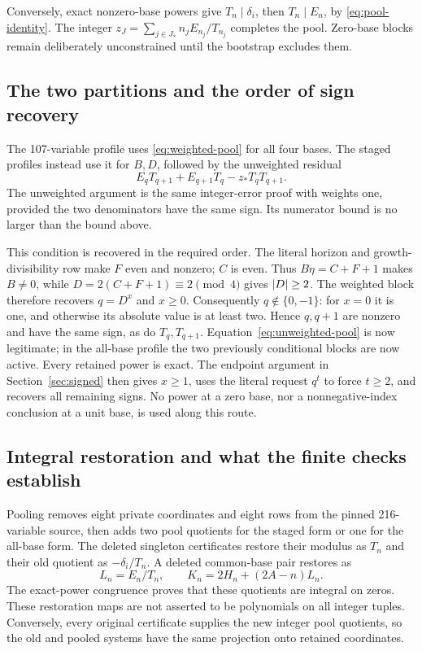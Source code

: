 Conversely, exact nonzero-base powers give \(T_n\mid\delta_i\),
then \(T_n\mid E_n\), by \eqref{eq:pool-identity}. The integer
\(z_J=\sum_{j\in J_*}n_jE_{n_j}/T_{n_j}\) completes the pool.
Zero-base blocks remain deliberately unconstrained until the bootstrap
excludes them.

\subsection{The two partitions and the order of sign recovery}

The 107-variable profile uses \eqref{eq:weighted-pool} for all four
bases. The staged profiles instead use it for \(B,D\), followed by
the unweighted residual
\begin{equation}\label{eq:unweighted-pool}
 E_qT_{q+1}+E_{q+1}T_q-z_*T_qT_{q+1}.
\end{equation}
The unweighted argument is the same integer-error proof with weights one,
provided the two denominators have the same sign. Its numerator bound is
no larger than the bound above.

This condition is recovered in the required order. The literal horizon
and growth-divisibility row make \(F\) even and nonzero; \(C\) is even.
Thus \(B\eta=C+F+1\) makes \(B\ne0\), while
\(D=2(C+F+1)\equiv2\pmod4\) gives \(\lvert D\rvert\ge2\).
The weighted block therefore recovers \(q=D^x\) and \(x\ge0\).
Consequently \(q\notin\{0,-1\}\): for \(x=0\) it is one, and
otherwise its absolute value is at least two. Hence \(q,q+1\) are
nonzero and have the same sign, as do \(T_q,T_{q+1}\).
Equation~\eqref{eq:unweighted-pool} is now legitimate; in the all-base
profile the two previously conditional blocks are now active. Every
retained power is exact. The endpoint argument in
Section~\ref{sec:signed} then gives \(x\ge1\), uses the literal request
\(q^t\) to force \(t\ge2\), and recovers all remaining signs.
No power at a zero base, nor a nonnegative-index conclusion at a unit
base, is used along this route.

\subsection{Integral restoration and what the finite checks establish}

Pooling removes eight private coordinates and eight rows from the pinned
216-variable source, then adds two pool quotients for the staged form or
one for the all-base form. The deleted singleton certificates restore
their modulus as \(T_n\) and their old quotient as
\(-\delta_i/T_n\). A deleted common-base pair restores as
\[
 L_n=E_n/T_n,\qquad K_n=2H_n+(2A-n)L_n.
\]
The exact-power congruence proves that these quotients are integral on
zeros. These restoration maps are not asserted to be polynomials on all
integer tuples. Conversely, every original certificate supplies the new
integer pool quotients, so the old and pooled systems have the same
projection onto retained coordinates.

